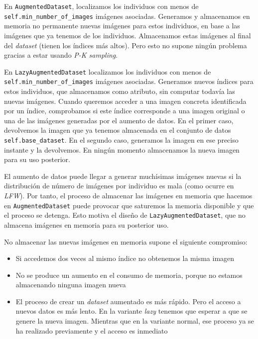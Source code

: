 En \lstinline{AugmentedDataset}, localizamos los individuos con menos de \lstinline{self.min_number_of_images} imágenes asociadas. Generamos y almacenamos en memoria no permanente nuevas imágenes para estos individuos, en base a las imágenes que ya tenemos de los individuos. Almacenamos estas imágenes al final del \textit{dataset} (tienen los índices más altos). Pero esto no supone ningún problema gracias a estar usando \textit{P-K sampling}.

En \lstinline{LazyAugmentedDataset} localizamos los individuos con menos de \lstinline{self.min_number_of_images} imágenes asociadas. Generamos nuevos índices para estos individuos, que almacenamos como atributo, sin computar todavía las nuevas imágenes. Cuando queremos acceder a una imagen concreta identificada por un índice, comprobamos si este índice corresponde a una imagen original o una de las imágenes generadas por el aumento de datos. En el primer caso, devolvemos la imagen que ya tenemos almacenada en el conjunto de datos \lstinline{self.base_dataset}. En el segundo caso, generamos la imagen en ese preciso instante y la devolvemos. En ningún momento almacenamos la nueva imagen para su uso posterior.

El aumento de datos puede llegar a generar muchísimas imágenes nuevas si la distribución de número de imágenes por individuo es mala (como ocurre en \textit{LFW}). Por tanto, el proceso de almacenar las imágenes en memoria que hacemos en \lstinline{AugmentedDataset} puede provocar que saturemos la memoria disponible y que el proceso se detenga. Esto motiva el diseño de \lstinline{LazyAugmentedDataset}, que no almacena imágenes en memoria para su posterior uso.

No almacenar las nuevas imágenes en memoria supone el siguiente compromiso:

\begin{itemize}
    \item Si accedemos dos veces al mismo índice no obtenemos la misma imagen
    \item No se produce un aumento en el consumo de memoria, porque no estamos almacenando ninguna imagen nueva
    \item El proceso de crear un \textit{dataset} aumentado es más rápido. Pero el acceso a nuevos datos es más lento. En la variante \textit{lazy} tenemos que esperar a que se genere la nueva imagen. Mientras que en la variante normal, ese proceso ya se ha realizado previamente y el acceso es inmediato
\end{itemize}

